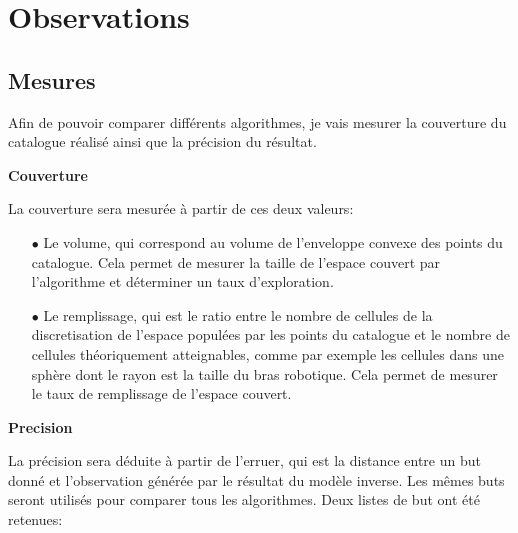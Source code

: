 \documentclass[11pt,french]{report}
\begin{document}
\chapter{Observations}

\section{Mesures}

Afin de pouvoir comparer différents algorithmes, je vais mesurer la couverture du catalogue réalisé ainsi que la précision du résultat.

\phantom{INVISIBLE LINE}

\textbf{Couverture}

\phantom{INVISIBLE LINE}

La couverture sera mesurée à partir de ces deux valeurs:

\begin{itemize}
    \item[$\bullet$] Le volume, qui correspond au volume de l'enveloppe convexe des points du catalogue.
Cela permet de mesurer la taille de l'espace couvert par l'algorithme et déterminer un taux d'exploration.
    \item[$\bullet$] Le remplissage, qui est le ratio entre le nombre de cellules de la discretisation de l'espace populées par les points du catalogue et le nombre de cellules théoriquement atteignables, comme par exemple les cellules dans une sphère dont le rayon est la taille du bras robotique.
Cela permet de mesurer le taux de remplissage de l'espace couvert.
\end{itemize}

\phantom{INVISIBLE LINE}

\textbf{Precision}

\phantom{INVISIBLE LINE}

La précision sera déduite à partir de l'erruer, qui est la distance entre un but donné et l'observation générée par le résultat du modèle inverse.
Les mêmes buts seront utilisés pour comparer tous les algorithmes.
Deux listes de but ont été retenues:
\end{document}
